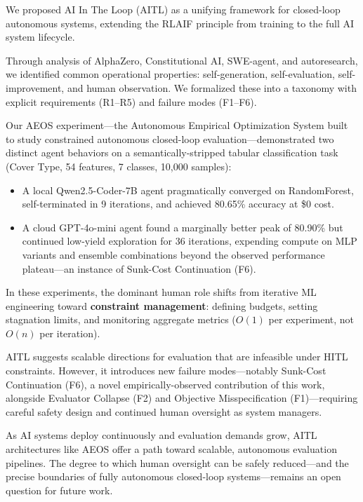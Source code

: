 \documentclass[11pt]{article}
\begin{document}
We proposed AI In The Loop (AITL) as a unifying framework for closed-loop autonomous systems, extending the RLAIF principle from training to the full AI system lifecycle.

Through analysis of AlphaZero, Constitutional AI, SWE-agent, and autoresearch, we identified common operational properties: self-generation, self-evaluation, self-improvement, and human observation. We formalized these into a taxonomy with explicit requirements (R1--R5) and failure modes (F1--F6).

Our AEOS experiment---the Autonomous Empirical Optimization System built to study constrained autonomous closed-loop evaluation---demonstrated two distinct agent behaviors on a semantically-stripped tabular classification task (Cover Type, 54 features, 7 classes, 10,000 samples):
\begin{itemize}[nosep]
  \item A local Qwen2.5-Coder-7B agent pragmatically converged on RandomForest, self-terminated in 9 iterations, and achieved 80.65\% accuracy at \$0 cost.
  \item A cloud GPT-4o-mini agent found a marginally better peak of 80.90\% but continued low-yield exploration for 36 iterations, expending compute on MLP variants and ensemble combinations beyond the observed performance plateau---an instance of Sunk-Cost Continuation (F6).
\end{itemize}

In these experiments, the dominant human role shifts from iterative ML engineering toward \textbf{constraint management}: defining budgets, setting stagnation limits, and monitoring aggregate metrics ($O(1)$ per experiment, not $O(n)$ per iteration).

AITL suggests scalable directions for evaluation that are infeasible under HITL constraints. However, it introduces new failure modes---notably Sunk-Cost Continuation (F6), a novel empirically-observed contribution of this work, alongside Evaluator Collapse (F2) and Objective Misspecification (F1)---requiring careful safety design and continued human oversight as system managers.

As AI systems deploy continuously and evaluation demands grow, AITL architectures like AEOS offer a path toward scalable, autonomous evaluation pipelines. The degree to which human oversight can be safely reduced---and the precise boundaries of fully autonomous closed-loop systems---remains an open question for future work.

\appendix
\end{document}
